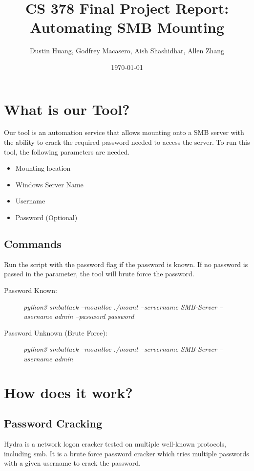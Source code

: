 \documentclass[a4paper]{article}
\title{\textbf{CS 378 Final Project Report:
\\{\Large Automating SMB Mounting}}}
\author{Dustin Huang, Godfrey Macasero, Aish Shashidhar, Allen Zhang}
\date{\today}
\begin{document}
\maketitle

\section{What is our Tool?}
\label{sec:introduction}

Our tool is an automation service that allows mounting onto a SMB server with the ability to crack the required password needed to access the server. To run this tool, the following parameters are needed.
\begin{itemize}
\item Mounting location
\item Windows Server Name
\item Username
\item Password (Optional)
\end{itemize}

\subsection*{Commands}
Run the script with the password flag if the password is known. If no password is passed in the parameter, the tool will brute force the password.
\begin{description}
\item[Password Known:] \textit{python3 smbattack --mountloc ./mount --servername SMB-Server --username admin --password password}
\item[Password Unknown (Brute Force):] \textit{python3 smbattack --mountloc ./mount --servername SMB-Server --username admin}
\end{description}

\renewcommand{\thesubsection}{\Alph{subsection}.}

\section{How does it work?}
\subsection{Password Cracking}
Hydra is a network logon cracker tested on multiple well-known protocols, including smb. It is a brute force password cracker which tries multiple passwords with a given username to crack the password.
\end{document}
